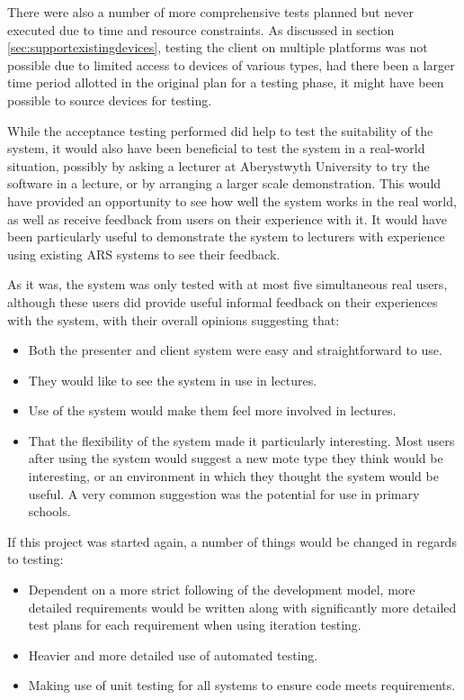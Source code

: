 \documentclass[a4papert,11pt,notitlepage]{article}
\begin{document}
There were also a number of more comprehensive tests planned but never executed due to time and resource constraints. As discussed in section \ref{sec:supportexistingdevices}, testing the client on multiple platforms was not possible due to limited access to devices of various types, had there been a larger time period allotted in the original plan for a testing phase, it might have been possible to source devices for testing.

While the acceptance testing performed did help to test the suitability of the system, it would also have been beneficial to test the system in a real-world situation, possibly by asking a lecturer at Aberystwyth University to try the software in a lecture, or by arranging a larger scale demonstration. This would have provided an opportunity to see how well the system works in the real world, as well as receive feedback from users on their experience with it. It would have been particularly useful to demonstrate the system to lecturers with experience using existing ARS systems to see their feedback.

As it was, the system was only tested with at most five simultaneous real users, although these users did provide useful informal feedback on their experiences with the system, with their overall opinions suggesting that:
\begin{itemize}
\item Both the presenter and client system were easy and straightforward to use.
\item They would like to see the system in use in lectures.
\item Use of the system would make them feel more involved in lectures.
\item That the flexibility of the system made it particularly interesting. Most users after using the system would suggest a new mote type they think would be interesting, or an environment in which they thought the system would be useful. A very common suggestion was the potential for use in primary schools.
\end{itemize}

If this project was started again, a number of things would be changed in regards to testing:
\begin{itemize}
\item Dependent on a more strict following of the development model, more detailed requirements would be written along with significantly more detailed test plans for each requirement when using iteration testing.
\item Heavier and more detailed use of automated testing.
\item Making use of unit testing for all systems to ensure code meets requirements.
\end{itemize}
\end{document}
